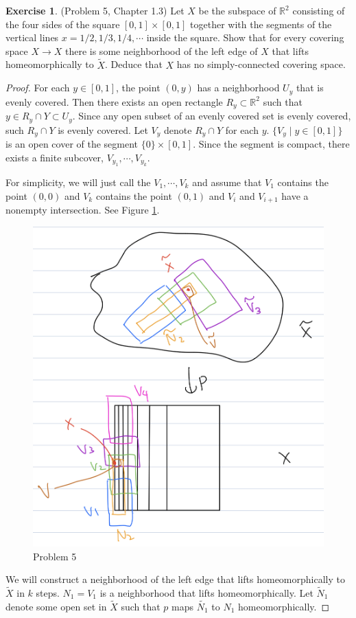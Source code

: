 \documentclass[12pt, psamsfonts]{amsart}
\theoremstyle{definition}
\newtheorem*{exer}{Exercise}
\theoremstyle{remark}
\numberwithin{equation}{section}
\begin{document}
\begin{exer}{(Problem 5, Chapter 1.3)}
  Let $X$ be the subspace of $\mathbb{R}^2$ consisting of the four sides of the square $[0, 1] \times [0, 1]$ together with the segments of the vertical lines $x = 1/2, 1/3, 1/4, \cdots$ inside the square.
  Show that for every covering space $X \rightarrow X$ there is some neighborhood of the left edge of $X$ that lifts homeomorphically to $\tilde{X}$.
  Deduce that $X$ has no simply-connected covering space.
\end{exer}

\begin{proof}
  For each $y \in [0, 1]$, the point $(0, y)$ has a neighborhood $U_y$ that is evenly covered.
  Then there exists an open rectangle $R_y \subset \mathbb{R}^2$ such that $y \in R_y \cap Y \subset U_y$.
  Since any open subset of an evenly covered set is evenly covered, such $R_y \cap Y$ is evenly covered.
  Let $V_y$ denote $R_y \cap Y$ for each $y$.
  $\{ V_y  \mid y \in [0, 1] \}$ is an open cover of the segment $\{ 0 \} \times [0, 1]$.
  Since the segment is compact, there exists a finite subcover, $V_{y_1}, \cdots, V_{y_k}$.

  For simplicity, we will just call the $V_1, \cdots, V_k$ and assume that $V_1$ contains the point $(0, 0)$ and $V_k$ contains the point $(0, 1)$ and $V_i$ and $V_{i + 1}$ have a nonempty intersection.
  See Figure \ref{fig:problem5}.
  \begin{figure}
    \includegraphics[width=.5\linewidth]{problem5.jpeg}
    \caption{Problem 5}
    \label{fig:problem5}
  \end{figure}

  We will construct a neighborhood of the left edge that lifts homeomorphically to $\tilde{X}$ in $k$ steps.
  $N_1 = V_1$ is a neighborhood that lifts homeomorphically.
  Let $\tilde{N}_1$ denote some open set in $\tilde{X}$ such that $p$ maps $\tilde{N_1}$ to $N_1$ homeomorphically.


\end{proof}
\end{document}
